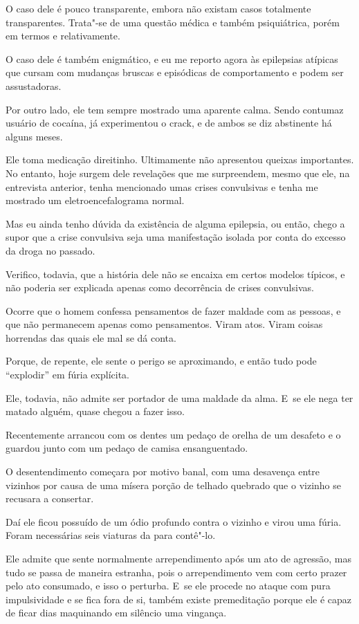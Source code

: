  

O caso dele é pouco transparente, embora não existam casos totalmente
transparentes. Trata"-se de uma questão médica e também psiquiátrica,
porém em termos e relativamente.

O caso dele é também enigmático, e eu me reporto agora às epilepsias
atípicas que cursam com mudanças bruscas e episódicas de comportamento e
podem ser assustadoras.

Por outro lado, ele tem sempre mostrado uma aparente calma. Sendo
contumaz usuário de cocaína, já experimentou o crack, e de ambos se diz
abstinente há alguns meses.

Ele toma medicação direitinho. Ultimamente não apresentou queixas
importantes. No entanto, hoje surgem dele revelações que me surpreendem,
mesmo que ele, na entrevista anterior, tenha mencionado umas crises
convulsivas e tenha me mostrado um eletroencefalograma normal.

Mas eu ainda tenho dúvida da existência de alguma epilepsia, ou então,
chego a supor que a crise convulsiva seja uma manifestação isolada por
conta do excesso da droga no passado.

Verifico, todavia, que a história dele não se encaixa em certos modelos
típicos, e não poderia ser explicada apenas como decorrência de crises
convulsivas.

Ocorre que o homem confessa pensamentos de fazer maldade com as pessoas,
e que não permanecem apenas como pensamentos. Viram atos. Viram coisas
horrendas das quais ele mal se dá conta.

Porque, de repente, ele sente o perigo se aproximando, e então tudo pode
``explodir'' em fúria explícita.

Ele, todavia, não admite ser portador de uma maldade da alma. E~se ele
nega ter matado alguém, quase chegou a fazer isso.

Recentemente arrancou com os dentes um pedaço de orelha de um desafeto e
o guardou junto com um pedaço de camisa ensanguentado.

O desentendimento começara por motivo banal, com uma desavença entre
vizinhos por causa de uma mísera porção de telhado quebrado que o
vizinho se recusara a consertar.

Daí ele ficou possuído de um ódio profundo contra o vizinho e virou uma
fúria. Foram necessárias seis viaturas da  para contê"-lo.

Ele admite que sente normalmente arrependimento após um ato de agressão,
mas tudo se passa de maneira estranha, pois o arrependimento vem com
certo prazer pelo ato consumado, e isso o perturba. E~se ele procede no
ataque com pura impulsividade e se fica fora de si, também existe
premeditação porque ele é capaz de ficar dias maquinando em silêncio uma
vingança.

